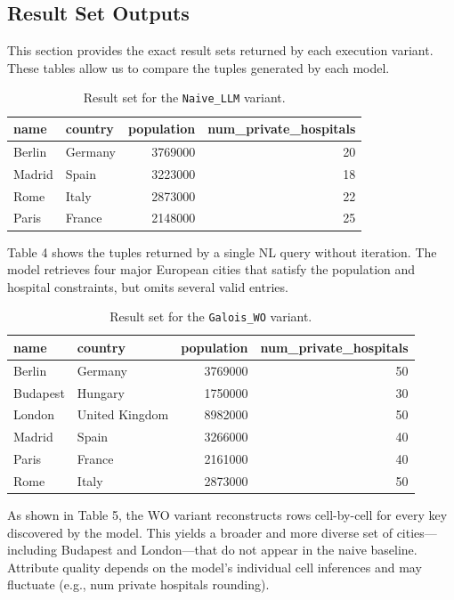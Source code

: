 \documentclass[12pt]{article}
\begin{document}
\subsection{Result Set Outputs}
This section provides the exact result sets returned by each execution variant. These tables allow us to compare the tuples generated by each model.
\begin{table}[H]
\centering
\begin{tabular}{l l r r}
\hline
\textbf{name} & \textbf{country} & \textbf{population} & \textbf{num\_private\_hospitals} \\
\hline
Berlin & Germany & 3769000 & 20 \\
Madrid & Spain   & 3223000 & 18 \\
Rome   & Italy   & 2873000 & 22 \\
Paris  & France  & 2148000 & 25 \\
\hline
\end{tabular}
\caption{Result set for the \texttt{Naive\_LLM} variant.}
\label{tab:naive-llm}
\end{table}

Table 4 shows the tuples returned by a single NL query without iteration. The model retrieves four major European cities that satisfy the population and hospital constraints, but omits several valid entries. 

\begin{table}[H]
\centering
\begin{tabular}{l l r r}
\hline
name & country & population & num\_private\_hospitals \\
\hline
Berlin & Germany & 3769000 & 50 \\
Budapest & Hungary & 1750000 & 30 \\
London & United Kingdom & 8982000 & 50 \\
Madrid & Spain & 3266000 & 40 \\
Paris & France & 2161000 & 40 \\
Rome & Italy & 2873000 & 50 \\
\hline
\end{tabular}
\caption{Result set for the \texttt{Galois\_WO} variant.}
\end{table}
As shown in Table 5, the WO variant reconstructs rows cell-by-cell for every key discovered by the model. This yields a broader and more diverse set of cities—including Budapest and London—that do not appear in the naive baseline. Attribute quality depends on the model’s individual cell inferences and may fluctuate (e.g., num private hospitals rounding).
\end{document}
